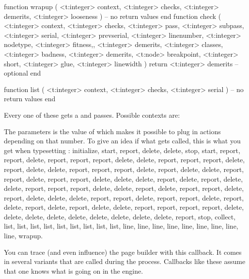 \starttyping[option=LUA]
function wrapup (
    <t:integer> context,
    <t:integer> checks,
    <t:integer> demerits,
    <t:integer> looseness
)
    -- no return values
end
\stoptyping
\starttyping[option=LUA]
function check (
    <t:integer> context,
    <t:integer> checks,
    <t:integer> pass,
    <t:integer> subpass,
    <t:integer> serial,
    <t:integer> prevserial,
    <t:integer> linenumber,
    <t:integer> nodetype,
    <t:integer> fitness,,
    <t:integer> demerits,
    <t:integer> classes,
    <t:integer> badness,
    <t:integer> demerits,
    <t:node>    breakpoint,
    <t:integer> short,
    <t:integer> glue,
    <t:integer> linewidth
)
    return <t:integer> demerits  -- optional
end
\stoptyping

\starttyping[option=LUA]
function list (
    <t:integer> context,
    <t:integer> checks,
    <t:integer> serial
)
    -- no return values
end
\stoptyping

Every one of these gets a  and  passes. Possible
contexts are:

\startcolumns[n=4]
\stopcolumns

The  parameters is the value of \type {\linebreakchecks} which
makes it possible to plug in actions depending on that number. To give an idea if
what gets called, this is what you get when typesetting :
initialize, start, report, delete, delete, stop, start, report, report, delete,
report, report, report, delete, delete, report, report, report, delete, report,
delete, delete, report, report, report, delete, report, delete, delete, report,
report, delete, report, report, delete, delete, delete, report, delete, report,
delete, delete, report, report, report, delete, delete, report, delete, report,
report, delete, report, delete, delete, delete, report, report, delete, report,
report, delete, report, delete, report, delete, report, delete, delete, report,
report, report, report, delete, delete, delete, delete, delete, delete, delete,
delete, delete, report, stop, collect, list, list, list, list, list, list, list,
list, list, line, line, line, line, line, line, line, line, line, wrapup.

\stopsubsection

\startsubsection[title=show_build]

You can trace (and even influence) the page builder with this callback. It comes in
several variants that are called during the process. Callbacks like these assume that
one knows what is going on in the engine.

